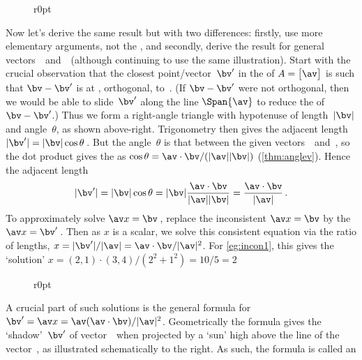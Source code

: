 \begin{figure}r{0pt}  \end{figure}
Now let's derive the same result but with two differences:
firstly, use more elementary arguments, not the \svd, 
and secondly, derive the result for general vectors~\av\ and~\bv\ (although continuing to use the same illustration).
Start with the crucial observation that the closest point\slash vector~\(\bv'\) in the  of \(A=\begin{bmatrix} \av \end{bmatrix}\) is such that \(\bv-\bv'\) is at , orthogonal, to~\av.
(If \(\bv-\bv'\) were not orthogonal, then we would be able to slide~\(\bv'\) along the line \(\Span\{\av\}\) to reduce the  of \(\bv-\bv'\).)
Thus we form a right-angle triangle with hypotenuse of length~\(|\bv|\) and angle~\(\theta\), as shown above-right.
Trigonometry then gives the adjacent length \(|\bv'|=|\bv|\cos\theta\)\,.
But the angle~\(\theta\) is that between the given vectors~\av\ and~\bv, so the dot product gives the  as \(\cos\theta={\av\cdot\bv}/({|\av||\bv|})\)  (\cref{thm:anglev}).
Hence the adjacent length \begin{equation*}
|\bv'|=|\bv|\cos\theta
=|\bv|\frac{\av\cdot\bv}{|\av||\bv|}=\frac{\av\cdot\bv}{|\av|}\,.
\end{equation*}
To approximately solve \(\av x=\bv\)\,, replace the inconsistent \(\av x=\bv\) by the  \(\av x=\bv'\)\,.
Then as \(x\) is a scalar, we solve this consistent equation via the ratio of lengths,  \(x=|\bv'|/|\av|={\av\cdot\bv}/|\av|^2\).
For \cref{eg:incon1}, this gives the `solution' \(x=(2,1)\cdot(3,4)/(2^2+1^2)=10/5=2\) 

\begin{figure}[7]r{0pt}  \end{figure}
A crucial part of such solutions is the general formula for \(\bv'=\av x=\av(\av\cdot\bv)/|\av|^2\).
Geometrically the formula gives the `shadow'~\(\bv'\) of vector~\bv\ when projected by a `sun' high above the line of the vector~\av, as illustrated schematically to the right.
As such, the formula is called an 
\vspace{2\baselineskip}

\endgroup%



